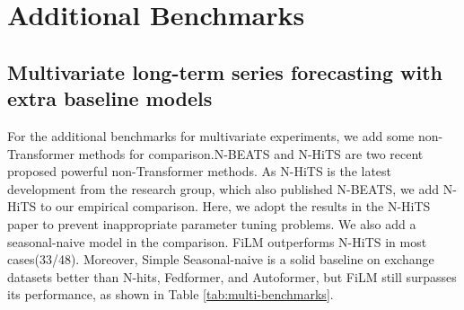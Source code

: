 \documentclass{article}
\begin{document}
 

\section{Additional Benchmarks}
\subsection{Multivariate long-term series forecasting with extra baseline models}
For the additional benchmarks for multivariate experiments, we add some non-Transformer methods for comparison.N-BEATS\cite{nbeats} and N-HiTS\cite{challu2022n} are two recent proposed powerful non-Transformer methods. As N-HiTS is the latest development from the research group, which also published N-BEATS, we add N-HiTS to our empirical comparison. Here, we adopt the results in the N-HiTS paper to prevent inappropriate parameter tuning problems. We also add a seasonal-naive model in the comparison. FiLM outperforms N-HiTS in most cases(33/48). Moreover, Simple Seasonal-naive\cite{seasonal-naive} is a solid baseline on exchange datasets better than N-hits, Fedformer, and Autoformer, but FiLM still surpasses its performance, as shown in Table \ref{tab:multi-benchmarks}.
\end{document}
